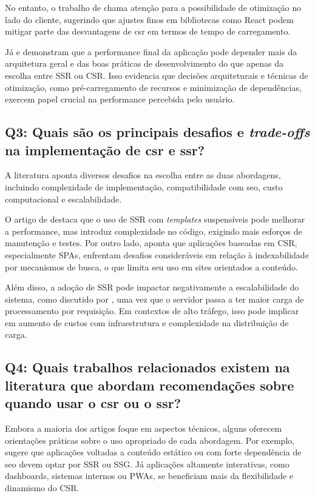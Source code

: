 No entanto, o trabalho de \cite{Pavic20211753} chama atenção para a possibilidade de otimização no lado do cliente, sugerindo que ajustes finos em bibliotecas como React podem mitigar parte das desvantagens de \acrshort{csr} em termos de tempo de carregamento.

Já \cite{Bekmanova2024265} e \cite{Klochkov2021} demonstram que a performance final da aplicação pode depender mais da arquitetura geral e das boas práticas de desenvolvimento do que apenas da escolha entre SSR ou CSR. Isso evidencia que decisões arquiteturais e técnicas de otimização, como pré-carregamento de recursos e minimização de dependências, exercem papel crucial na performance percebida pelo usuário.

\subsection{Q3: Quais são os principais desafios e \textit{trade-offs} na implementação de \acrshort{csr} e \acrshort{ssr}?}

A literatura aponta diversos desafios na escolha entre as duas abordagens, incluindo complexidade de implementação, compatibilidade com \acrshort{seo}, custo computacional e escalabilidade.

O artigo de \cite{Carvalho2025458} destaca que o uso de SSR com \textit{templates} suspensíveis pode melhorar a performance, mas introduz complexidade no código, exigindo mais esforços de manutenção e testes. Por outro lado, \cite{Kowalczyk202411597} aponta que aplicações baseadas em CSR, especialmente SPAs, enfrentam desafios consideráveis em relação à indexabilidade por mecanismos de busca, o que limita seu uso em sites orientados a conteúdo.

Além disso, a adoção de SSR pode impactar negativamente a escalabilidade do sistema, como discutido por \cite{Angkasa2023}, uma vez que o servidor passa a ter maior carga de processamento por requisição. Em contextos de alto tráfego, isso pode implicar em aumento de custos com infraestrutura e complexidade na distribuição de carga.

\subsection{Q4: Quais trabalhos relacionados existem na literatura que abordam recomendações sobre quando usar o \acrshort{csr} ou o \acrshort{ssr}?}

Embora a maioria dos artigos foque em aspectos técnicos, alguns oferecem orientações práticas sobre o uso apropriado de cada abordagem. Por exemplo, \cite{FadhilahIskandar2020} sugere que aplicações voltadas a conteúdo estático ou com forte dependência de \acrshort{seo} devem optar por SSR ou SSG. Já aplicações altamente interativas, como dashboards, sistemas internos ou PWAs, se beneficiam mais da flexibilidade e dinamismo do CSR.

